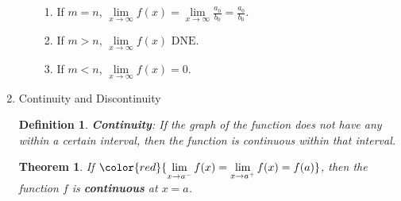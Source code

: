 \documentclass[12pt, a4paper]{article}
\newtheorem{theorem}{Theorem}[subsection]
\newtheorem{definition}{Definition}[subsection]
\begin{document}
\begin{enumerate}
\begin{itemize}
        \begin{enumerate}
            \item If $m=n$, $\lim\limits_{x\rightarrow \infty}f(x)=\lim\limits_{x\rightarrow \infty}\frac{a_0}{b_0}=\frac{a_0}{b_0}.$
            \item If $m>n$, $\lim\limits_{x\rightarrow \infty}f(x)\text{ DNE.}$
            \item If $m<n$, $\lim\limits_{x\rightarrow \infty}f(x)=0.$
        \end{enumerate}
    \end{itemize}
    \item Continuity and Discontinuity
    \begin{definition}
        {\color{red}\textbf{Continuity}}: If the graph of the function does not have any {\color{red}{breaks or holes}} within a certain interval, then the function is continuous within that interval.
    \end{definition}
    \begin{theorem}
        If ${\color{red}{\lim\limits_{x\rightarrow a^-}f(x)=\lim\limits_{x\rightarrow a^+}f(x)=f(a)}}$, then the function $f$ is \textbf{continuous} at $x=a$.
    \end{theorem}
\end{enumerate}
\end{document}
